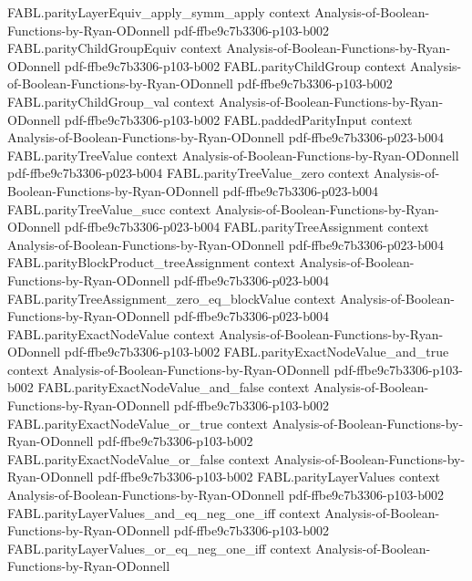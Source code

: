 \begin{theorem}
\proofstep
  {FABL.parityLayerEquiv_apply_symm_apply}
  {context}
  {Analysis-of-Boolean-Functions-by-Ryan-ODonnell}
  {pdf-ffbe9c7b3306-p103-b002}
\proofstep
  {FABL.parityChildGroupEquiv}
  {context}
  {Analysis-of-Boolean-Functions-by-Ryan-ODonnell}
  {pdf-ffbe9c7b3306-p103-b002}
\proofstep
  {FABL.parityChildGroup}
  {context}
  {Analysis-of-Boolean-Functions-by-Ryan-ODonnell}
  {pdf-ffbe9c7b3306-p103-b002}
\proofstep
  {FABL.parityChildGroup_val}
  {context}
  {Analysis-of-Boolean-Functions-by-Ryan-ODonnell}
  {pdf-ffbe9c7b3306-p103-b002}
\proofstep
  {FABL.paddedParityInput}
  {context}
  {Analysis-of-Boolean-Functions-by-Ryan-ODonnell}
  {pdf-ffbe9c7b3306-p023-b004}
\proofstep
  {FABL.parityTreeValue}
  {context}
  {Analysis-of-Boolean-Functions-by-Ryan-ODonnell}
  {pdf-ffbe9c7b3306-p023-b004}
\proofstep
  {FABL.parityTreeValue_zero}
  {context}
  {Analysis-of-Boolean-Functions-by-Ryan-ODonnell}
  {pdf-ffbe9c7b3306-p023-b004}
\proofstep
  {FABL.parityTreeValue_succ}
  {context}
  {Analysis-of-Boolean-Functions-by-Ryan-ODonnell}
  {pdf-ffbe9c7b3306-p023-b004}
\proofstep
  {FABL.parityTreeAssignment}
  {context}
  {Analysis-of-Boolean-Functions-by-Ryan-ODonnell}
  {pdf-ffbe9c7b3306-p023-b004}
\proofstep
  {FABL.parityBlockProduct_treeAssignment}
  {context}
  {Analysis-of-Boolean-Functions-by-Ryan-ODonnell}
  {pdf-ffbe9c7b3306-p023-b004}
\proofstep
  {FABL.parityTreeAssignment_zero_eq_blockValue}
  {context}
  {Analysis-of-Boolean-Functions-by-Ryan-ODonnell}
  {pdf-ffbe9c7b3306-p023-b004}
\proofstep
  {FABL.parityExactNodeValue}
  {context}
  {Analysis-of-Boolean-Functions-by-Ryan-ODonnell}
  {pdf-ffbe9c7b3306-p103-b002}
\proofstep
  {FABL.parityExactNodeValue_and_true}
  {context}
  {Analysis-of-Boolean-Functions-by-Ryan-ODonnell}
  {pdf-ffbe9c7b3306-p103-b002}
\proofstep
  {FABL.parityExactNodeValue_and_false}
  {context}
  {Analysis-of-Boolean-Functions-by-Ryan-ODonnell}
  {pdf-ffbe9c7b3306-p103-b002}
\proofstep
  {FABL.parityExactNodeValue_or_true}
  {context}
  {Analysis-of-Boolean-Functions-by-Ryan-ODonnell}
  {pdf-ffbe9c7b3306-p103-b002}
\proofstep
  {FABL.parityExactNodeValue_or_false}
  {context}
  {Analysis-of-Boolean-Functions-by-Ryan-ODonnell}
  {pdf-ffbe9c7b3306-p103-b002}
\proofstep
  {FABL.parityLayerValues}
  {context}
  {Analysis-of-Boolean-Functions-by-Ryan-ODonnell}
  {pdf-ffbe9c7b3306-p103-b002}
\proofstep
  {FABL.parityLayerValues_and_eq_neg_one_iff}
  {context}
  {Analysis-of-Boolean-Functions-by-Ryan-ODonnell}
  {pdf-ffbe9c7b3306-p103-b002}
\proofstep
  {FABL.parityLayerValues_or_eq_neg_one_iff}
  {context}
  {Analysis-of-Boolean-Functions-by-Ryan-ODonnell}

\end{theorem}
